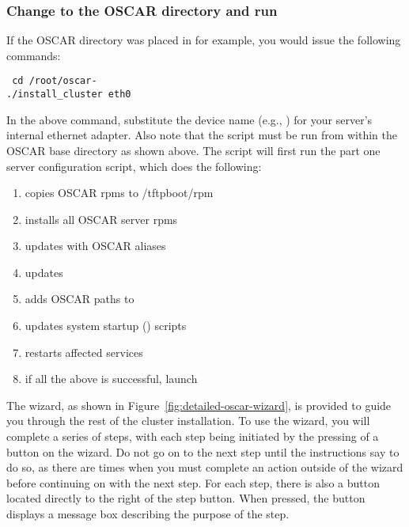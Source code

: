 \subsubsection{Change to the OSCAR directory and run }
\label{det:installcluster}

If the OSCAR directory was placed in  for example, you
would issue the following commands:

\vspace{11pt}
{\tt
  cd /root/oscar-\oscarversion \\
\indent  ./install\_cluster eth0
}
\vspace{11pt}
  
In the above command, substitute the device name (e.g., )
for your server's internal ethernet adapter. Also note that the
 script must be run from within the OSCAR base
directory as shown above. The script will first run the part one
server configuration script, which does the following:

\begin{enumerate}
\item copies OSCAR rpms to /tftpboot/rpm
\item installs all OSCAR server rpms
\item updates  with OSCAR aliases
\item updates  
\item adds OSCAR paths to  
\item updates system startup () scripts
\item restarts affected services
\item if all the above is successful, launch 
\end{enumerate}
  
The wizard, as shown in
Figure~\ref{fig:detailed-oscar-wizard}, is provided to guide you
through the rest of the cluster installation.  To use the wizard, you
will complete a series of steps, with each step being initiated by the
pressing of a button on the wizard. Do not go on to the next step
until the instructions say to do so, as there are times when you must
complete an action outside of the wizard before continuing on with the
next step. For each step, there is also a  button located
directly to the right of the step button. When pressed, the
 button displays a message box describing the purpose of
the step.


